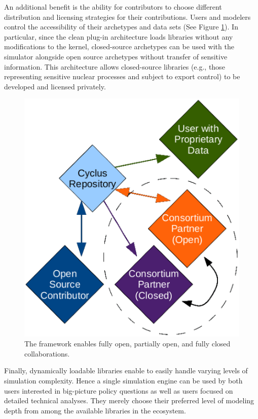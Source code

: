 An additional benefit is the ability for
contributors to choose different distribution and licensing strategies
for their contributions. Users and modelers control the accessibility of their archetypes and data sets (See Figure \ref{fig:modifiedopen}).
In particular, since the clean plug-in architecture loads libraries without any
modifications to the \Cyclus kernel, closed-source archetypes can be used with
the simulator alongside open source archetypes without transfer of sensitive information. This architecture
allows closed-source libraries (e.g., those representing sensitive nuclear
processes and subject to export control) to be developed and licensed privately.

\begin{figure}[htbp]
\begin{center}
\includegraphics[width=0.8\columnwidth]{./images/modifiedopen.eps}
\caption{The \Cyclus framework enables fully open, partially open, and fully
closed collaborations\cite{carlsen_cyclus_2014}.}
\end{center}
\label{fig:modifiedopen}
\end{figure}

Finally, dynamically loadable libraries enable \Cyclus to easily handle varying levels of simulation complexity. Hence a single
simulation engine can be used by both users interested in big-picture policy
questions as well as users focused on detailed technical
analyses. They merely choose their preferred level of modeling depth from among the
available libraries in the ecosystem.

